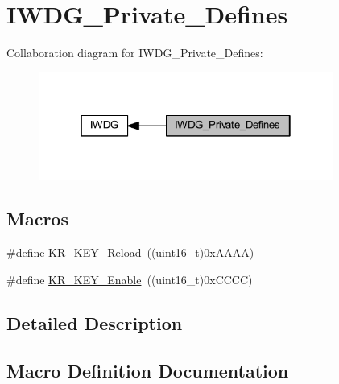 \hypertarget{group___i_w_d_g___private___defines}{}\section{I\+W\+D\+G\+\_\+\+Private\+\_\+\+Defines}
\label{group___i_w_d_g___private___defines}
Collaboration diagram for I\+W\+D\+G\+\_\+\+Private\+\_\+\+Defines\+:
\nopagebreak
\begin{figure}[H]
\begin{center}
\leavevmode
\includegraphics[width=274pt]{group___i_w_d_g___private___defines}
\end{center}
\end{figure}
\subsection*{Macros}
\begin{DoxyCompactItemize}
\item 
\#define \hyperlink{group___i_w_d_g___private___defines_gad5e5efc1dbd6a045da5a36c3d9df16a5}{K\+R\+\_\+\+K\+E\+Y\+\_\+\+Reload}~((uint16\+\_\+t)0x\+A\+A\+A\+A)
\item 
\#define \hyperlink{group___i_w_d_g___private___defines_ga833138e20c8a26786dd7ca3b132152ed}{K\+R\+\_\+\+K\+E\+Y\+\_\+\+Enable}~((uint16\+\_\+t)0x\+C\+C\+C\+C)
\end{DoxyCompactItemize}


\subsection{Detailed Description}


\subsection{Macro Definition Documentation}
\mbox{\label{group___i_w_d_g___private___defines_ga833138e20c8a26786dd7ca3b132152ed}} 
